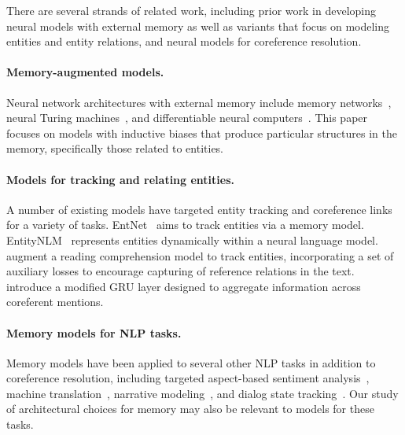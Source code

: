 \documentclass[11pt,a4paper]{article}
\begin{document}
There are several strands of related work, including prior work in developing neural models with external memory as well as variants that focus on modeling entities and entity relations, and neural models for coreference resolution.

\paragraph{Memory-augmented models.}

Neural network architectures with external memory include memory networks~\citep{weston-15,sukhbaatar-15}, neural Turing machines~\citep{graves2014neural}, and differentiable neural computers~\citep{graves2016hybrid}. This paper focuses on models with inductive biases that produce particular structures in the memory, specifically those related to entities.

\paragraph{Models for tracking and relating entities.}
A number of existing models have targeted entity tracking and coreference links for a variety of tasks.
EntNet~\citep{henaff2016tracking} aims to track entities via a memory model.
EntityNLM~\citep{D17-1195} represents entities dynamically within a neural language model. \citet{hoang-etal-2018-entity} augment a reading comprehension model to track entities, incorporating a set of auxiliary losses to encourage capturing of reference relations in the text. \citet{dhingra-etal-2018-neural} introduce a modified GRU layer designed to aggregate information across coreferent mentions.




\paragraph{Memory models for NLP tasks.}
Memory models have been applied to several other NLP tasks in addition to coreference resolution, including targeted aspect-based sentiment analysis~\citep{liu-etal-2018-recurrent}, machine translation~\citep{maruf-haffari-2018-document}, narrative modeling~\citep{liu-etal-2018-narrative}, and dialog state tracking~\citep{perez-liu-2017-dialog}. Our study of architectural choices for memory may also be relevant to models for these tasks.
\end{document}
